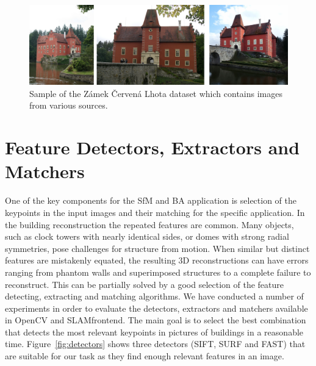 \begin{figure}[ht]
	\begin{center}
		\includegraphics[keepaspectratio,width=\textwidth]{fig/experiments-cervena-lhota.pdf}
	\end{center}
	\caption{Sample of the Zámek Červená Lhota dataset which contains images from various sources.}
	\label{fig:cervena-lhota}
\end{figure}

\section{Feature Detectors, Extractors and Matchers}
\label{sec:experiments-extractors}
One of the key components for the SfM and BA application is selection of the keypoints in the input images and their matching for the specific application.  In the building reconstruction the repeated features are common. Many objects, such as clock towers with nearly identical sides, or domes with strong radial symmetries, pose challenges for structure from motion. When similar but distinct features are mistakenly equated, the resulting 3D reconstructions can have errors ranging from phantom walls and superimposed structures to a complete failure to reconstruct. This can be partially solved by a good selection of the feature detecting, extracting and matching algorithms. We have conducted a number of experiments in order to evaluate the detectors, extractors and matchers available in OpenCV and SLAM\textunderscore frontend. The main goal is to select the best combination that detects the most relevant keypoints in pictures of buildings in a reasonable time. Figure~\ref{fig:detectors} shows three detectors (SIFT, SURF and FAST) that are suitable for our task as they find enough relevant features in an image.

